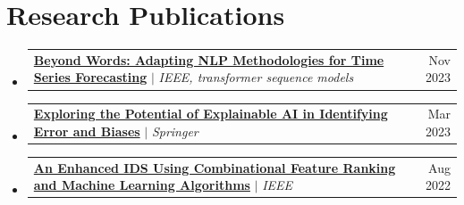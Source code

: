 \documentclass[10pt,letterpaper]{article}
\makeatletter
\newcommand{\resumeProjectHeading}[2]{
    \item
    \begin{tabular*}{0.97\textwidth}{l@{\extracolsep{\fill}}r}
      \small#1 & #2 \\
    \end{tabular*}\vspace{-7pt}
}
\newcommand{\resumeSubHeadingListStart}{\begin{itemize}[leftmargin=0.15in, label={}]}
\newcommand{\resumeSubHeadingListEnd}{\end{itemize}}
\makeatother
\begin{document}
\section{Research Publications}
  \resumeSubHeadingListStart
    \resumeProjectHeading
      {\href{https://ieeexplore.ieee.org/abstract/document/10627058}{\textbf{Beyond Words: Adapting NLP Methodologies for Time Series Forecasting}} $|$ \emph{IEEE, transformer sequence models}}{Nov 2023}
    \resumeProjectHeading
      {\href{https://link.springer.com/chapter/10.1007/978-981-19-8563-8_41}{\textbf{Exploring the Potential of Explainable AI in Identifying Error and Biases}} $|$ \emph{Springer}}{Mar 2023}
    \resumeProjectHeading
      {\href{https://ieeexplore.ieee.org/abstract/document/9847815}{\textbf{An Enhanced IDS Using Combinational Feature Ranking and Machine Learning Algorithms}} $|$ \emph{IEEE}}{Aug 2022}
  \resumeSubHeadingListEnd


\end{document}
